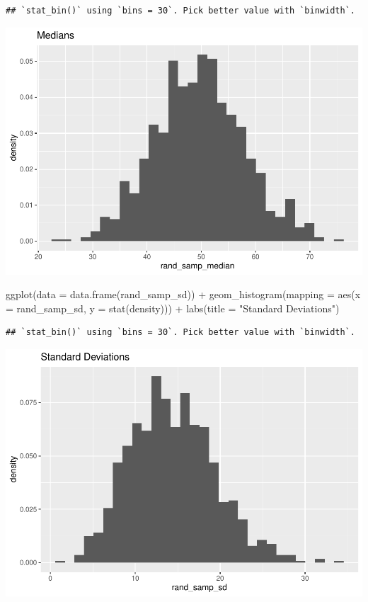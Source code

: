 \documentclass[
]{article}
\newenvironment{Shaded}{\begin{snugshade}}{\end{snugshade}}
\newcommand{\AttributeTok}[1]{\textcolor[rgb]{0.77,0.63,0.00}{#1}}
\newcommand{\FunctionTok}[1]{\textcolor[rgb]{0.00,0.00,0.00}{#1}}
\newcommand{\NormalTok}[1]{#1}
\newcommand{\SpecialCharTok}[1]{\textcolor[rgb]{0.00,0.00,0.00}{#1}}
\newcommand{\StringTok}[1]{\textcolor[rgb]{0.31,0.60,0.02}{#1}}
\begin{document}
\begin{verbatim}
## `stat_bin()` using `bins = 30`. Pick better value with `binwidth`.
\end{verbatim}

\includegraphics{Class_Exercises_ClassNotes_5_files/figure-latex/unnamed-chunk-5-1.pdf}
\newpage

\begin{Shaded}
\begin{Highlighting}[]
\FunctionTok{ggplot}\NormalTok{(}\AttributeTok{data =} \FunctionTok{data.frame}\NormalTok{(rand\_samp\_sd)) }\SpecialCharTok{+}
  \FunctionTok{geom\_histogram}\NormalTok{(}\AttributeTok{mapping =} \FunctionTok{aes}\NormalTok{(}\AttributeTok{x =}\NormalTok{ rand\_samp\_sd, }\AttributeTok{y =} \FunctionTok{stat}\NormalTok{(density))) }\SpecialCharTok{+}
  \FunctionTok{labs}\NormalTok{(}\AttributeTok{title =} \StringTok{"Standard Deviations"}\NormalTok{)}
\end{Highlighting}
\end{Shaded}

\begin{verbatim}
## `stat_bin()` using `bins = 30`. Pick better value with `binwidth`.
\end{verbatim}

\includegraphics{Class_Exercises_ClassNotes_5_files/figure-latex/unnamed-chunk-6-1.pdf}
\newpage
\end{document}
